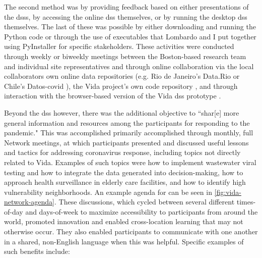 The second method was by providing feedback based on either presentations of the \acp{dss}, by accessing the online \ac{dss} themselves, or by running the desktop \ac{dss} themselves. The last of these was possible by either downloading and running the Python code or through the use of executables that Lombardo and I put together using PyInstaller for specific stakeholders. These activities were conducted through weekly or biweekly meetings between the Boston-based research team and individual site representatives and through online collaboration via the local collaborators own online data repositories (e.g. Rio de Janeiro's Data.Rio \cite{institutopereirapassosDataRio2017} or Chile's Datos-\ac{covid} \cite{ministeriodecienciatecnologiaconocimientoeinnovacionDatosCOVID192021}), the Vida project's own code repository \cite{reidMITVidaRepository2021}, and through interaction with the browser-based version of the Vida \ac{dss} prototype \cite{bluerasterMITVidaSupportBoston2021}.

Beyond the \ac{dss} however, there was the additional objective to ``shar[e] more general information and resources among the participants for responding to the pandemic." This was accomplished primarily accomplished through monthly, full Network meetings, at which participants presented and discussed useful lessons and tactics for addressing coronavirus response, including topics not directly related to Vida. Examples of such topics were how to implement wastewater viral testing and how to integrate the data generated into decision-making, how to approach health surveillance in elderly care facilities, and how to identify high vulnerability neighborhoods. An example agenda for can be seen in \ref{fig:vida-network-agenda}. These discussions, which cycled between several different times-of-day and days-of-week to maximize accessibility to participants from around the world, promoted innovation and enabled cross-location learning that may not otherwise occur. They also enabled participants to communicate with one another in a shared, non-English language when this was helpful. Specific examples of such benefits include:

